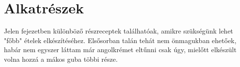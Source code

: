 \chapter*{Alkatrészek} \label{ch:alkatreszek}

Jelen fejezetben különböző részreceptek találhatóak, amikre szükségünk lehet "főbb" ételek elkészítéséhez. Elsősorban talán tehát nem önmagukban ehetőek, habár nem egyszer láttam már angolkrémet eltűnni csak úgy, mielőtt elkészült volna hozzá a mákos guba többi része.


